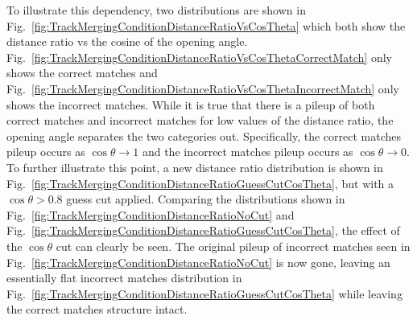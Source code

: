 To illustrate this dependency, two distributions are shown in Fig.~\ref{fig:TrackMergingConditionDistanceRatioVsCosTheta} which both show the distance ratio vs the cosine of the opening angle.  Fig.~\ref{fig:TrackMergingConditionDistanceRatioVsCosThetaCorrectMatch} only shows the correct matches and Fig.~\ref{fig:TrackMergingConditionDistanceRatioVsCosThetaIncorrectMatch} only shows the incorrect matches.  While it is true that there is a pileup of both correct matches and incorrect matches for low values of the distance ratio, the opening angle separates the two categories out.  Specifically, the correct matches pileup occurs as $\cos\theta \rightarrow 1$ and the incorrect matches pileup occurs as $\cos\theta \rightarrow 0$.  To further illustrate this point, a new distance ratio distribution is shown in Fig.~\ref{fig:TrackMergingConditionDistanceRatioGuessCutCosTheta}, but with a $\cos\theta > 0.8$ guess cut applied.  Comparing the distributions shown in Fig.~\ref{fig:TrackMergingConditionDistanceRatioNoCut} and Fig.~\ref{fig:TrackMergingConditionDistanceRatioGuessCutCosTheta}, the effect of the $\cos\theta$ cut can clearly be seen.  The original pileup of incorrect matches seen in Fig.~\ref{fig:TrackMergingConditionDistanceRatioNoCut} is now gone, leaving an essentially flat incorrect matches distribution in Fig.~\ref{fig:TrackMergingConditionDistanceRatioGuessCutCosTheta} while leaving the correct matches structure intact.  
